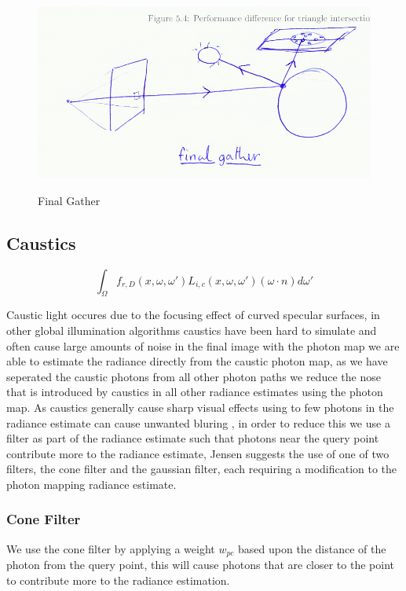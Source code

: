 \begin{figure}
\centering
\includegraphics[width=\textwidth]{./images/final_gather.png}
\label{fig:final_gather}
\caption{Final Gather}
\end{figure}

\subsection{Caustics}
\begin{equation*}
		\int_{\Omega}
			f_{r,D}(x, \omega, \omega')
			L_{i,c}(x,\omega,\omega')
			(\omega \cdot n)d\omega'
\end{equation*}

Caustic light occures due to the focusing effect of curved specular surfaces, in other global illumination algorithms
caustics have been hard to simulate \cite{Jensen96a} and often cause large amounts of noise in the final image
with the photon map we are able to estimate the radiance directly from the caustic photon map, as we have seperated the
caustic photons from all other photon paths we reduce the nose that is introduced by caustics in all other radiance
estimates using the photon map. As caustics generally cause sharp visual effects using to few photons in the radiance
estimate can cause unwanted bluring \cite{JensenBook}, in order to reduce this we use a filter as part of the radiance estimate such
that photons near the query point contribute more to the radiance estimate, Jensen suggests the use of one of two filters, the
cone filter and the gaussian filter, each requiring a modification to the photon mapping radiance estimate.

\subsubsection{Cone Filter}
We use the cone filter by applying a weight $w_{pc}$ based upon the distance of the photon from the query point, this will
cause photons that are closer to the point to contribute more to the radiance estimation.

